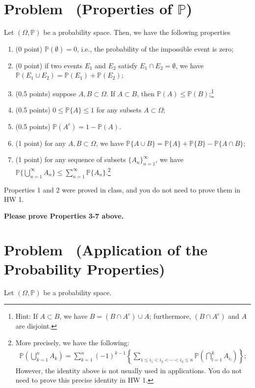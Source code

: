 \documentclass[11pt]{article}
\newcounter{pppp}
\newcommand{\prob}{\arabic{pppp}} %
\newcommand{\increase}{\addtocounter{pppp}{1}} %
\newcommand{\newproblem}[2]{
    \increase
    \section*{Problem \prob~(#1) \hfill {#2}}
}
\begin{document}
\newproblem{Properties of $\mathbb{P}$}{ }

Let $(\Omega, \mathbb{P})$ be a probability space. Then, we have the following properties
\begin{enumerate}
\item (0 point) $\mathbb{P}(\emptyset)=0$, i.e., the probability of the impossible event is zero; 
\item (0 point) if two events $E_1$ and $E_2$ satisfy $E_1\cap E_2=\emptyset$, we have $\mathbb{P}(E_1\cup E_2)=\mathbb{P}(E_1)+ \mathbb{P}(E_2)$;
\item (0.5 points) suppose $A,B\subset\Omega$. If $A\subset B$, then $\mathbb{P}(A)\le \mathbb{P}(B)$;\footnote{Hint: If $A\subset B$, we have $B=(B\cap A^c)\cup A$; furthermore, $(B\cap A^c)$ and $A$ are disjoint.}
\item (0.5 points) $0\le \mathbb{P}\{A\} \le 1$ for any subsets $A \subset \Omega$; 
\item (0.5 points) $\mathbb{P}(A^c)=1-\mathbb{P}(A)$.
    \item (1 point) for any $A,B\subset\Omega$, we have $\mathbb{P}\{A\cup B\}=\mathbb{P}\{A\}+\mathbb{P}\{B\}-\mathbb{P}\{A\cap B\}$;
    \item (1 point) for any sequence of subsets $\{A_n\}_{n=1}^\infty$, we have $\mathbb{P}\{\bigcup_{n=1}^\infty A_n\}\le\sum_{n=1}^\infty\mathbb{P}\{A_n\}$.\footnote{More precisely, we have the following: 
    \begin{align*}
    \mathbb{P}\left(\bigcup_{k=1}^n A_k\right)=\sum_{k=1}^n(-1)^{k-1}\left\{\sum_{1\le i_1<i_2<\cdots<i_k\le n} \mathbb{P}\left(\bigcap_{l=1}^k A_{i_l}\right)\right\};  
    \end{align*}
    However, the identity above is not usually used in applications. You do not need to prove this precise identity in HW 1.}
\end{enumerate}

Properties 1 and 2 were proved in class, and you do not need to prove them in HW 1. 

\textbf{Please prove Properties 3-7 above. }



\newproblem{Application of the Probability Properties}{ }

Let $(\Omega, \mathbb{P})$ be a probability space.
\end{document}
